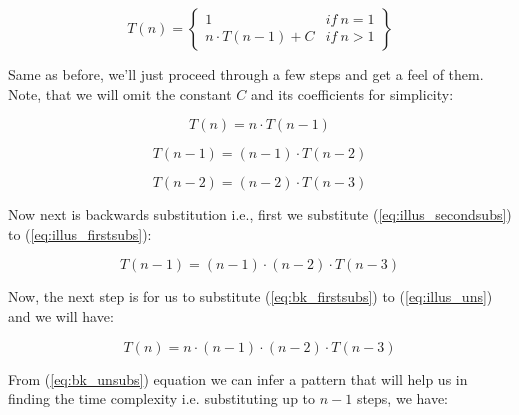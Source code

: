 \documentclass[a4paper,12pt]{article}
\theoremstyle{definition}
\begin{document}
    \begin{equation*}
        \label{eq:illus_eg}
        T(n) = \begin{Bmatrix}
                   1                    & if\ n = 1 \\
                   n \cdot T(n - 1) + C & if\ n > 1
        \end{Bmatrix}
    \end{equation*}

    \noindent
    Same as before, we'll just proceed through a few steps and get a feel of them.
    Note, that we will omit the constant $C$ and its coefficients for simplicity:

    \begin{equation}
        T(n) = n \cdot T(n - 1)
        \label{eq:illus_uns}
    \end{equation}

    \begin{equation}
        T(n - 1) = (n - 1) \cdot T(n - 2)
        \label{eq:illus_firstsubs}
    \end{equation}

    \begin{equation}
        T(n - 2) = (n - 2) \cdot T(n - 3)
        \label{eq:illus_secondsubs}
    \end{equation}

    \noindent
    Now next is backwards substitution i.e., first we substitute (\ref{eq:illus_secondsubs})
    to (\ref{eq:illus_firstsubs}):

    \begin{equation}
        T(n - 1) = (n - 1) \cdot (n - 2) \cdot T(n - 3)
        \label{eq:bk_firstsubs}
    \end{equation}

    \noindent
    Now, the next step is for us to substitute (\ref{eq:bk_firstsubs}) to (\ref{eq:illus_uns}) and we will have:

    \begin{equation}
        T(n) = n \cdot (n - 1) \cdot (n - 2) \cdot T(n - 3)
        \label{eq:bk_unsubs}
    \end{equation}

    \noindent
    From (\ref{eq:bk_unsubs}) equation we can infer a pattern that will help us in finding the time complexity
    i.e. substituting up to $n - 1$ steps, we have:
\end{document}
